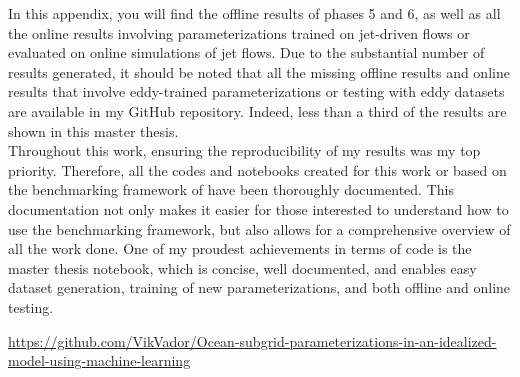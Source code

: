 %
\newpage


\setlength{\parindent}{0pt}

In this appendix, you will find the offline results of phases 5 and 6, as well as all the online results involving parameterizations trained on jet-driven flows or evaluated on online simulations of jet flows. Due to the substantial number of results generated, it should be noted that all the missing offline results and online results that involve eddy-trained parameterizations or testing with eddy datasets are available in my GitHub repository. Indeed, less than a third of the results are shown in this master thesis.\\

Throughout this work, ensuring the reproducibility of my results was my top priority. Therefore, all the codes and notebooks created for this work or based on the benchmarking framework of \cite{Benchmarking} have been thoroughly documented. This documentation not only makes it easier for those interested to understand how to use the benchmarking framework, but also allows for a comprehensive overview of all the work done. One of my proudest achievements in terms of code is the master thesis notebook, which is concise, well documented, and enables easy dataset generation, training of new parameterizations, and both offline and online testing.

\vspace{2em}
\begin{center}
	\href{https://github.com/VikVador/Ocean-subgrid-parameterizations-in-an-idealized-model-using-machine-learning}{https://github.com/VikVador/Ocean-subgrid-parameterizations-in-an-idealized-model-using-machine-learning}
\end{center}
	
%
%
\newpage
\thispagestyle{empty}
